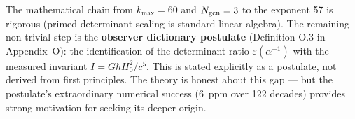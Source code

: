 \documentclass[11pt]{article}
\begin{document}
The mathematical chain from $k_{\max} = 60$ and $N_{\rm gen} = 3$ to the
exponent 57 is rigorous (primed determinant scaling is standard linear algebra).
The remaining non-trivial step is the \textbf{observer dictionary postulate}
(Definition O.3 in Appendix~O): the identification of the determinant ratio
$\varepsilon(\alpha^{-1})$ with the measured invariant $I = G\hbar H_0^2/c^5$.
This is stated explicitly as a postulate, not derived from first principles.
The theory is honest about this gap --- but the postulate's extraordinary
numerical success ($6$~ppm over 122 decades) provides strong motivation for
seeking its deeper origin.
\end{document}
